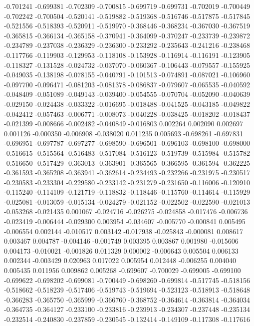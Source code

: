 -0.701241
-0.699381
-0.702309
-0.700815
-0.699719
-0.699731
-0.702019
-0.700449
-0.702242
-0.700504
-0.520141
-0.519882
-0.519368
-0.516746
-0.517875
-0.517845
-0.521556
-0.518393
-0.520911
-0.519970
-0.368446
-0.368234
-0.367030
-0.367519
-0.365815
-0.366134
-0.365158
-0.370941
-0.364099
-0.370247
-0.233739
-0.239872
-0.234789
-0.237038
-0.236329
-0.236300
-0.233292
-0.235643
-0.241216
-0.238468
-0.117766
-0.119903
-0.129953
-0.118108
-0.153928
-0.116914
-0.116191
-0.123905
-0.118327
-0.131528
-0.024732
-0.037070
-0.060367
-0.106443
-0.079557
-0.155925
-0.049035
-0.138198
-0.078155
-0.040791
-0.101513
-0.074891
-0.087021
-0.106960
-0.097700
-0.096471
-0.081203
-0.081378
-0.086837
-0.079607
-0.065535
-0.040592
-0.048409
-0.051089
-0.049143
-0.039400
-0.054555
-0.070704
-0.052090
-0.040639
-0.029150
-0.024438
-0.033322
-0.016695
-0.018488
-0.041525
-0.043185
-0.049822
-0.042412
-0.057463
-0.006771
-0.008073
-0.040228
-0.038425
-0.018202
-0.018437
-0.021399
-0.008666
-0.002482
-0.040849
-0.016803
0.002264
0.002090
0.002697
0.001126
-0.000350
-0.006908
-0.038020
0.011235
0.005693
-0.698261
-0.697831
-0.696951
-0.697787
-0.697277
-0.698590
-0.696501
-0.696103
-0.698100
-0.698000
-0.516615
-0.515564
-0.516483
-0.517084
-0.516123
-0.519739
-0.515984
-0.515782
-0.516650
-0.517429
-0.363013
-0.363901
-0.365565
-0.366595
-0.361594
-0.362225
-0.361593
-0.365208
-0.363941
-0.362614
-0.234493
-0.232266
-0.231975
-0.230517
-0.230583
-0.233304
-0.229580
-0.233142
-0.231279
-0.231650
-0.116006
-0.120910
-0.115240
-0.114109
-0.121719
-0.118832
-0.118446
-0.115760
-0.114614
-0.115929
-0.025081
-0.013059
-0.015134
-0.024279
-0.021152
-0.022502
-0.022590
-0.021013
-0.053268
-0.021435
0.001067
-0.024716
-0.026275
-0.024858
-0.017476
-0.006736
-0.023419
-0.006444
-0.029300
0.003954
-0.034607
-0.005770
-0.000841
0.005495
-0.006554
0.002144
-0.010517
0.003142
-0.017938
-0.025843
-0.000081
0.008617
0.003467
0.004787
-0.004146
-0.001749
0.003395
0.003867
0.001980
-0.015606
0.004173
-0.010021
-0.001826
0.011329
0.000002
-0.006643
0.005504
0.006133
0.002344
-0.003429
0.020963
0.017022
0.005954
0.012448
-0.006255
0.004040
0.005435
0.011956
0.009862
0.005268
-0.699607
-0.700029
-0.699005
-0.699100
-0.699622
-0.698202
-0.699081
-0.700449
-0.698260
-0.699814
-0.517745
-0.518156
-0.518662
-0.518239
-0.517406
-0.519743
-0.519694
-0.523123
-0.518913
-0.518648
-0.366283
-0.365750
-0.365999
-0.366760
-0.368752
-0.364614
-0.363814
-0.364034
-0.364735
-0.364127
-0.233100
-0.233816
-0.239913
-0.234307
-0.237448
-0.235134
-0.232514
-0.240830
-0.237859
-0.230545
-0.132414
-0.149109
-0.117308
-0.117616
